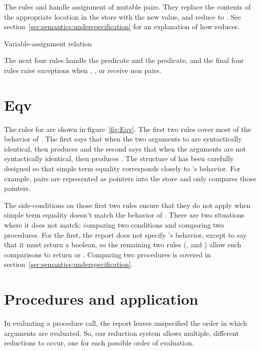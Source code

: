The rules  and  handle assignment of mutable pairs. 
They replace the contents of the appropriate location in the store with the new value, and reduce to . See section~\ref{sec:semantics:underspecification} for an explanation of how  reduces.

\beginfig
\subfigureadjust{}
\begin{center}

\end{center}
\caption{Variable-assignment relation}\label{fig:varsetd}
\endfig

The next four rules handle the  predicate and the  predicate, and the final four rules raise exceptions when , ,  or  receive non pairs.

\section{Eqv}

The rules for  are shown in figure~\ref{fig:Eqv}. The first two rules cover most of the behavior of . 
The first says that when the two arguments to  are syntactically identical, then  produces \semtrue{} and the second says that when the arguments are not syntactically identical, then  produces \semfalse{}. 
The structure of  has been carefully designed so that simple term equality corresponds closely to 's behavior. 
For example, pairs are represented as pointers into the store and  only compares those pointers.

The side-conditions on those first two rules ensure that they do not apply when simple term equality doesn't match the behavior of . There are two situations where it does not match: comparing two conditions and comparing two procedures. For the first, the report does not specify 's behavior, except to say that it must return a boolean, so the remaining two rules (, and ) allow such comparisons to return \semtrue{} or \semfalse{}. Comparing two procedures is covered in section~\ref{sec:semantics:underspecification}. 

\section{Procedures and application}

In evaluating a procedure call, the report leaves
unspecified the order in which arguments are evaluated. So, our reduction system allows multiple, different reductions to occur, one for each possible order of evaluation.

